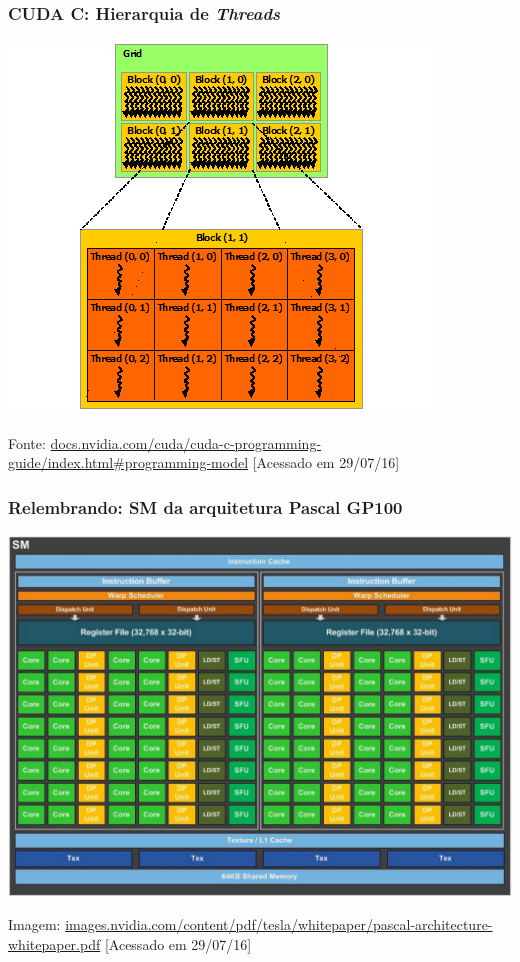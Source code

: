 \documentclass[10pt, compress]{beamer}
\begin{document}
\begin{frame}
    \frametitle{CUDA C: Hierarquia de \textit{Threads}}
    \centering
    \includegraphics[width=.7\textwidth]{grid-of-thread-blocks}

    \tiny{Fonte: \url{docs.nvidia.com/cuda/cuda-c-programming-guide/index.html\#programming-model} [Acessado em 29/07/16]}
\end{frame}

\begin{frame}
    \frametitle{Relembrando: SM da arquitetura Pascal GP100}
    \centering
    \includegraphics[width=.9\textwidth]{gp100_SM_diagram}

    \vfill

    \tiny{Imagem: \url{images.nvidia.com/content/pdf/tesla/whitepaper/pascal-architecture-whitepaper.pdf} [Acessado em 29/07/16]}
\end{frame}
\end{document}
